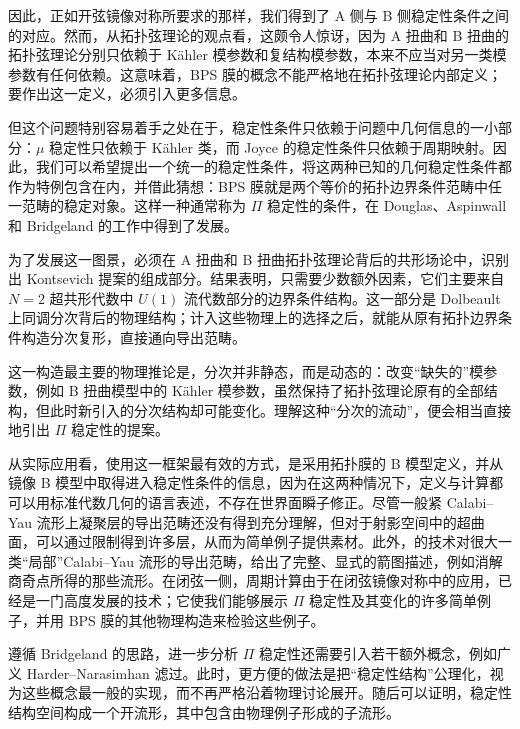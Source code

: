 因此，正如开弦镜像对称所要求的那样，我们得到了 A 侧与 B 侧稳定性条件之间的对应。然而，从拓扑弦理论的观点看，这颇令人惊讶，因为 A 扭曲和 B 扭曲的拓扑弦理论分别只依赖于 Kähler 模参数和复结构模参数，本来不应当对另一类模参数有任何依赖。这意味着，BPS 膜的概念不能严格地在拓扑弦理论内部定义；要作出这一定义，必须引入更多信息。

但这个问题特别容易着手之处在于，稳定性条件只依赖于问题中几何信息的一小部分：$\mu$ 稳定性只依赖于 Kähler 类，而 Joyce 的稳定性条件只依赖于周期映射。因此，我们可以希望提出一个统一的稳定性条件，将这两种已知的几何稳定性条件都作为特例包含在内，并借此猜想：BPS 膜就是两个等价的拓扑边界条件范畴中任一范畴的稳定对象。这样一种通常称为 $\Pi$ 稳定性的条件，在 Douglas、Aspinwall 和 Bridgeland 的工作中得到了发展。

为了发展这一图景，必须在 A 扭曲和 B 扭曲拓扑弦理论背后的共形场论中，识别出 Kontsevich 提案的组成部分。结果表明，只需要少数额外因素，它们主要来自 $N=2$ 超共形代数中 $U(1)$ 流代数部分的边界条件结构。这一部分是 Dolbeault 上同调分次背后的物理结构；计入这些物理上的选择之后，就能从原有拓扑边界条件构造分次复形，直接通向导出范畴。

这一构造最主要的物理推论是，分次并非静态，而是动态的：改变“缺失的”模参数，例如 B 扭曲模型中的 Kähler 模参数，虽然保持了拓扑弦理论原有的全部结构，但此时新引入的分次结构却可能变化。理解这种“分次的流动”，便会相当直接地引出 $\Pi$ 稳定性的提案。

从实际应用看，使用这一框架最有效的方式，是采用拓扑膜的 B 模型定义，并从镜像 B 模型中取得进入稳定性条件的信息，因为在这两种情况下，定义与计算都可以用标准代数几何的语言表述，不存在世界面瞬子修正。尽管一般紧 Calabi--Yau 流形上凝聚层的导出范畴还没有得到充分理解，但对于射影空间中的超曲面，可以通过限制得到许多层，从而为简单例子提供素材。此外，的技术对很大一类“局部”Calabi--Yau 流形的导出范畴，给出了完整、显式的箭图描述，例如消解商奇点所得的那些流形。在闭弦一侧，周期计算由于在闭弦镜像对称中的应用，已经是一门高度发展的技术；它使我们能够展示 $\Pi$ 稳定性及其变化的许多简单例子，并用 BPS 膜的其他物理构造来检验这些例子。

遵循 Bridgeland 的思路，进一步分析 $\Pi$ 稳定性还需要引入若干额外概念，例如广义 Harder--Narasimhan 滤过。此时，更方便的做法是把“稳定性结构”公理化，视为这些概念最一般的实现，而不再严格沿着物理讨论展开。随后可以证明，稳定性结构空间构成一个开流形，其中包含由物理例子形成的子流形。

